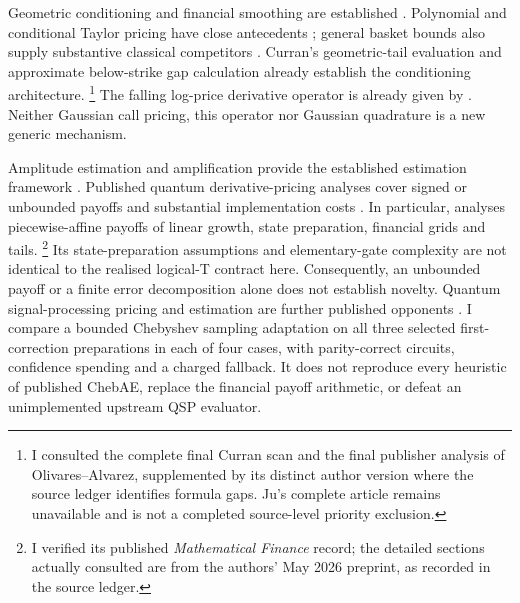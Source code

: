 \documentclass[11pt]{article}
\begin{document}
Geometric conditioning and financial smoothing are established
\citep{curran,dingechormann,bayer}. Polynomial and conditional Taylor pricing
have close antecedents \citep{ju,olivaresalvarez2016}; general basket bounds
also supply substantive classical competitors \citep{caldana}. Curran's geometric-tail evaluation and approximate below-strike gap
calculation already establish the conditioning architecture.
\footnote{I consulted the complete final Curran scan and the final publisher
analysis of Olivares--Alvarez, supplemented by its distinct author version
where the source ledger identifies formula gaps. Ju's complete article
remains unavailable and is not a completed source-level priority exclusion.} The falling log-price derivative operator is
already given by \citet{carr2001}. Neither Gaussian call pricing, this
operator nor Gaussian quadrature is a new generic mechanism.

Amplitude estimation and amplification provide the established estimation
framework \citep{brassard,montanaro}. Published quantum derivative-pricing
analyses cover signed or unbounded payoffs and substantial implementation
costs \citep{rebentrost,chakrabarti}. In particular,
\citet{chenlineufeld2026} analyses piecewise-affine payoffs of linear growth,
state preparation, financial grids and tails. \footnote{I verified its published \emph{Mathematical Finance} record;
the detailed sections actually consulted are from the authors' May 2026
preprint, as recorded in the source ledger.}
Its state-preparation assumptions and elementary-gate complexity are not
identical to the realised logical-T contract here. Consequently, an
unbounded payoff or a finite error decomposition alone does not establish
novelty. Quantum signal-processing pricing and estimation are further
published opponents \citep{stamatopoulos,rallfuller2023}. I compare a bounded Chebyshev sampling adaptation on all three selected
first-correction preparations in each of four cases, with parity-correct
circuits, confidence spending and a charged fallback. It does not reproduce every heuristic of published ChebAE,
replace the financial payoff arithmetic, or defeat an unimplemented
upstream QSP evaluator.
\end{document}
